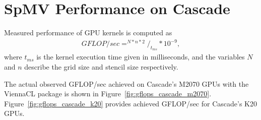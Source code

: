 \documentclass{report}
\begin{document}
 

\section{SpMV Performance on Cascade}

Measured performance of GPU kernels is computed as
\begin{align}
GFLOP/sec = ^{N * n * 2} /_{t_{ms}} * 10^{-9},
\end{align}
where $t_{ms}$ is the kernel execution time given in milliseconds, and the variables $N$ and $n$ describe the grid size and stencil size respectively. 

The actual observed GFLOP/sec achieved on Cascade's M2070 GPUs with the ViennaCL package is shown in Figure~\ref{fig:gflops_cascade_m2070}. Figure~\ref{fig:gflops_cascade_k20} provides achieved GFLOP/sec for Cascade's K20 GPUs.  
\end{document}
